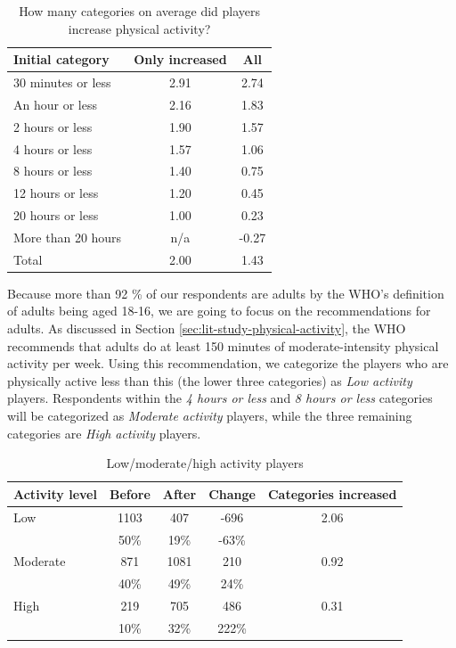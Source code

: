 \begin{table}[h]
	\centering
	\caption{How many categories on average did players increase physical activity?}
	\label{tbl:physical-activity-average-categories-increased}
	\begin{tabular}{|l|c|c|}
		\hline
		\textbf{Initial category} & \textbf{Only increased} & \textbf{All}\\
		\hline\hline
		30 minutes or less	& 2.91	& 2.74\\
		An hour or less		& 2.16	& 1.83\\
		2 hours or less		& 1.90	& 1.57\\
		4 hours or less		& 1.57	& 1.06\\
		8 hours or less		& 1.40	& 0.75\\
		12 hours or less	& 1.20	& 0.45\\
		20 hours or less	& 1.00	& 0.23\\
		More than 20 hours	& n/a	& -0.27\\
		\hline
		Total				& 2.00	& 1.43\\\hline
	\end{tabular}
\end{table}

Because more than 92 \% of our respondents are adults by the WHO's definition of adults being aged 18-16, we are going to focus on the recommendations for adults. As discussed in Section \ref{sec:lit-study-physical-activity}, the WHO recommends that adults do at least 150 minutes of moderate-intensity physical activity per week. Using this recommendation, we categorize the players who are physically active less than this (the lower three categories) as \emph{Low activity} players. Respondents within the \emph{4 hours or less} and \emph{8 hours or less} categories will be categorized as \emph{Moderate activity} players, while the three remaining categories are \emph{High activity} players.

\begin{table}
	\centering
	\caption{Low/moderate/high activity players}
	\label{tbl:physical-activity-low-moderate-high}
	\begin{tabular}{|l|c|c|c|c|}
		\hline
		\textbf{Activity level}	& \textbf{Before}	& \textbf{After}	& \textbf{Change}	& \textbf{Categories increased}\\
		\hline\hline
		Low		& 1103	& 407	& -696	& 2.06\\
				& 50\%	& 19\%	& -63\%	&\\\hline
		Moderate& 871	& 1081	& 210	& 0.92\\
				& 40\%	& 49\%	& 24\%	&\\\hline
		High	& 219	& 705	& 486	& 0.31\\
				& 10\%	& 32\%	& 222\%	&\\\hline
	\end{tabular}
\end{table}


